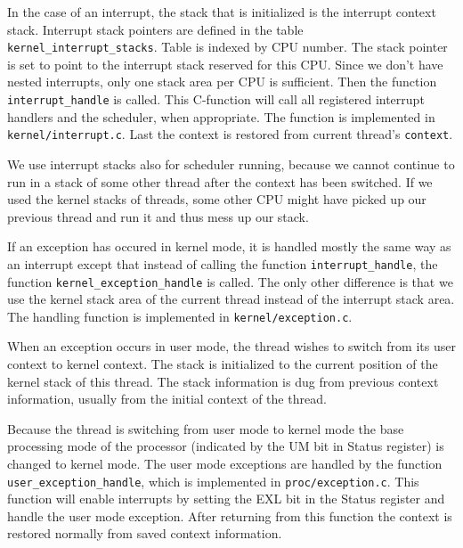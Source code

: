 \documentclass[twoside,a4paper]{report}
\begin{document}
 

In the case of an interrupt, the stack that is initialized is the
interrupt context stack. Interrupt stack pointers are defined in the table
\texttt{kernel\_interrupt\_stacks}. Table is indexed by CPU number.
The stack pointer is set to point to the interrupt stack reserved for
this CPU. Since we don't have nested interrupts, only one stack area
per CPU is sufficient. Then the function \texttt{interrupt\_handle} is
called. This C-function will call all registered interrupt handlers
and the scheduler, when appropriate. The function is implemented in
\texttt{kernel/interrupt.c}. Last the context is restored from current
thread's \texttt{context}. 

We use interrupt stacks also for scheduler running, because we cannot
continue to run in a stack of some other thread after the context has
been switched. If we used the kernel stacks of threads, some other CPU
might have picked up our previous thread and run it and thus mess up
our stack.


If an exception has occured in kernel mode, it is handled mostly the
same way as an interrupt except that instead of calling the function
\texttt{interrupt\_handle}, the function
\texttt{kernel\_exception\_handle} is called. The only other difference is
that we use the kernel stack area of the current thread instead of the
interrupt stack area. The handling function is implemented in
\texttt{kernel/exception.c}.


When an exception occurs in user mode, the thread wishes to switch
from its user context to kernel context. The stack is initialized to
the current position of the kernel stack of this thread. The stack
information is dug from previous context information, usually from
the initial context of the thread. 

Because the thread is switching from user mode to kernel mode the base
processing mode of the processor (indicated by the UM bit  in Status register) is changed to kernel mode. The user mode
exceptions are handled by the function
\texttt{user\_exception\_handle}, which is implemented in
\texttt{proc/exception.c}. This function will enable interrupts by
setting the EXL bit  in the Status register and handle
the user mode exception. After returning from this function the
context is restored normally from saved context information.
\end{document}
